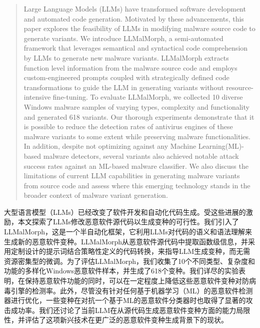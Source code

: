 
\begin{abstract}
Large Language Models (LLMs) have transformed software development and automated code generation. Motivated by these advancements, this paper explores the feasibility of LLMs in modifying malware source code to generate variants. We introduce LLMalMorph, a semi-automated framework that leverages semantical and syntactical code comprehension by LLMs to generate new malware variants. LLMalMorph extracts function level information from the malware source code and employs custom-engineered prompts coupled with strategically defined code transformations to guide the LLM in generating variants without resource-intensive fine-tuning. To evaluate LLMalMorph, we collected 10 diverse Windows malware samples of varying types, complexity and functionality and generated 618 variants. Our thorough experiments demonstrate that it is possible to reduce the detection rates of antivirus engines of these malware variants to some extent while preserving malware functionalities. In addition, despite not optimizing against any Machine Learning(ML)-based malware detectors, several variants also achieved notable attack success rates against an ML-based malware classifier. We also discuss the limitations of current LLM capabilities in generating malware variants from source code and assess where this emerging technology stands in the broader context of malware variant generation.
\end{abstract}

\begin{abstractEn}
大型语言模型（LLMs）已经改变了软件开发和自动化代码生成。受这些进展的激励，本文探索了LLMs修改恶意软件源代码以生成变种的可行性。我们引入了LLMalMorph，这是一个半自动化框架，它利用LLMs对代码的语义和语法理解来生成新的恶意软件变种。LLMalMorph从恶意软件源代码中提取函数级信息，并采用定制设计的提示词结合策略性定义的代码转换，来指导LLM生成变种，而无需资源密集型的微调。为了评估LLMalMorph，我们收集了10个不同类型、复杂度和功能的多样化Windows恶意软件样本，并生成了618个变种。我们详尽的实验表明，在保持恶意软件功能的同时，可以在一定程度上降低这些恶意软件变种对防病毒引擎的检测率。此外，尽管没有针对任何基于机器学习（ML）的恶意软件检测器进行优化，一些变种在对抗一个基于ML的恶意软件分类器时也取得了显著的攻击成功率。我们还讨论了当前LLM在从源代码生成恶意软件变种方面的能力局限性，并评估了这项新兴技术在更广泛的恶意软件变种生成背景下的现状。
\end{abstractEn}
